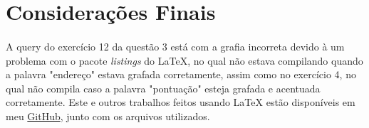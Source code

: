\documentclass{article}
\begin{document}
\section*{Considerações Finais}
\paragraph{} A query do exercício 12 da questão 3 está com a grafia incorreta devido à um problema com o pacote \textit{listings} do \LaTeX{}, no qual não estava compilando quando a palavra "endereço" estava grafada corretamente, assim como no exercício 4, no qual não compila caso a palavra "pontuação" esteja grafada e acentuada corretamente. Este e outros trabalhos feitos usando \LaTeX{} estão disponíveis em meu \href{https://github.com/gpgp2006/LaTeX}{GitHub}, junto com os arquivos utilizados.
\end{document}
